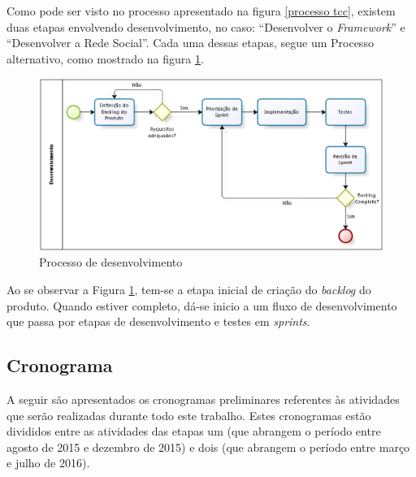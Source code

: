 Como pode ser visto no processo apresentado na figura \ref{processo tcc}, existem duas etapas  envolvendo desenvolvimento, no caso: ``Desenvolver o \textit{Framework}'' e ``Desenvolver a Rede Social''. Cada uma dessas etapas, segue um Processo alternativo, como mostrado na figura \ref{Processo desenvolvimento}.

\begin{figure}[h]
	\centering
	\includegraphics[scale=0.4]{figuras/capitulo4/processo_desenvolvimento.eps}
	\caption{Processo de desenvolvimento}
	\label{Processo desenvolvimento}
\end{figure}

Ao se observar a Figura \ref{Processo desenvolvimento}, tem-se a etapa inicial de criação do \textit{backlog} do produto. Quando estiver completo, dá-se inicio a um fluxo de desenvolvimento que passa por etapas de desenvolvimento e testes em \textit{sprints}.

\subsection{Cronograma}

A seguir são apresentados os cronogramas preliminares referentes às atividades que serão realizadas durante todo este trabalho. Estes cronogramas estão divididos entre as atividades das etapas um (que abrangem o período entre agosto de 2015 e dezembro de 2015) e dois (que abrangem o período entre março e julho de 2016).

